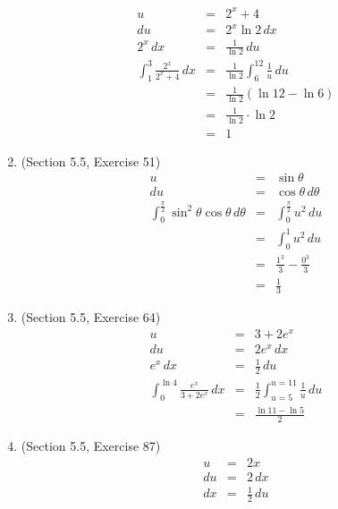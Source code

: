 \documentclass{article}
\begin{document}
\begin{enumerate}
\begin{eqnarray}
            u &=& 2^x + 4 \\
            du &=& 2^x\ln{2}\,dx \\
            2^x\,dx &=& \frac{1}{\ln{2}}\,du \\
            \int_1^3{\frac{2^x}{2^x + 4}\,dx} &=& \frac{1}{\ln{2}}\int_6^{12}{\frac{1}{u}\,du} \\
                                              &=& \frac{1}{\ln{2}}\left(\ln{12} - \ln{6}\right) \\
                                              &=& \frac{1}{\ln{2}}\cdot\ln{2} \\
                                              &=& 1
        \end{eqnarray}
    \item (Section 5.5, Exercise 51)
        \begin{eqnarray}
            u &=& \sin{\theta} \\
            du &=& \cos{\theta}\,d\theta \\
            \int_0^{\frac{\pi}{2}}{\sin^2{\theta}\cos{\theta}\,d\theta} &=& \int_0^{\frac{\pi}{2}}{u^2\,du} \\
                                                                        &=& \int_0^1{u^2\,du} \\
                                                                        &=& \frac{1^3}{3} - \frac{0^3}{3} \\
                                                                        &=& \frac{1}{3}
        \end{eqnarray}
    \item (Section 5.5, Exercise 64)
        \begin{eqnarray}
            u &=& 3 + 2e^x \\
            du &=& 2e^x\,dx \\
            e^x\,dx &=& \frac{1}{2}\,du \\
            \int_0^{\ln{4}}{\frac{e^x}{3 + 2e^x}\,dx} &=& \frac{1}{2}\int_{u = 5}^{u = 11}{\frac{1}{u}\,du} \\
                                                      &=& \frac{\ln{11} - \ln{5}}{2}
        \end{eqnarray}
    \item (Section 5.5, Exercise 87)
        \begin{eqnarray}
            u &=& 2x \\
            du &=& 2\,dx \\
            dx &=& \frac{1}{2}\,du \\

\end{eqnarray}
\end{enumerate}
\end{document}
